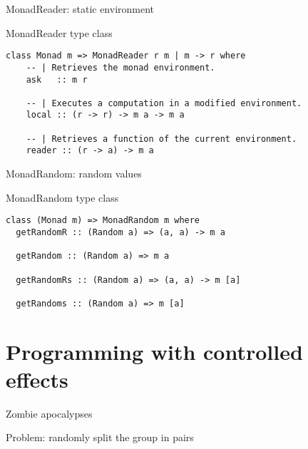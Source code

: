 \begin{frame}[fragile]{MonadReader: static environment}
  \begin{block}{MonadReader type class}
  \begin{verbatim}
class Monad m => MonadReader r m | m -> r where
    -- | Retrieves the monad environment.
    ask   :: m r

    -- | Executes a computation in a modified environment.
    local :: (r -> r) -> m a -> m a

    -- | Retrieves a function of the current environment.
    reader :: (r -> a) -> m a
  \end{verbatim}
  \end{block}
\end{frame}

\begin{frame}[fragile]{MonadRandom: random values}
  \begin{block}{MonadRandom type class}
  \begin{verbatim}
class (Monad m) => MonadRandom m where
  getRandomR :: (Random a) => (a, a) -> m a

  getRandom :: (Random a) => m a

  getRandomRs :: (Random a) => (a, a) -> m [a]

  getRandoms :: (Random a) => m [a]
  \end{verbatim}
  \end{block}
\end{frame}

\section{Programming with controlled effects}



\begin{frame}[fragile]{Zombie apocalypses}
  \begin{figure}
    \centering
    \def\svgwidth{\columnwidth}
    
\end{figure}
\end{frame}

\begin{frame}[fragile]{Problem: randomly split the group in pairs}
  \begin{figure}
    \centering
    \def\svgwidth{\columnwidth}
    
\end{figure}
\end{frame}

